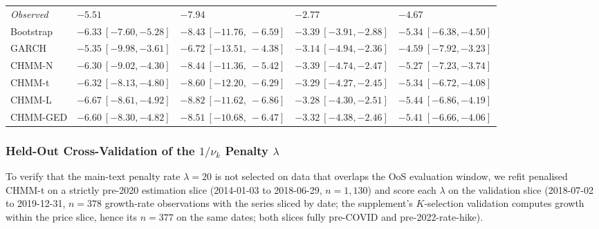 \begin{table}[H]
{\begin{tabular}{l l l l l}
\textit{Observed}  & $-5.51$                      & $-7.94$                      & $-2.77$                      & $-4.67$                      \\
Bootstrap & $-6.33\ [-7.60, -5.28]$      & $-8.43\ [-11.76,\ -6.59]$    & $-3.39\ [-3.91, -2.88]$      & $-5.34\ [-6.38, -4.50]$      \\
GARCH     & $-5.35\ [-9.98, -3.61]$      & $-6.72\ [-13.51,\ -4.38]$    & $-3.14\ [-4.94, -2.36]$      & $-4.59\ [-7.92, -3.23]$      \\
CHMM-N    & $-6.30\ [-9.02, -4.30]$      & $-8.44\ [-11.36,\ -5.42]$    & $-3.39\ [-4.74, -2.47]$      & $-5.27\ [-7.23, -3.74]$      \\
CHMM-t    & $-6.32\ [-8.13, -4.80]$      & $-8.60\ [-12.20,\ -6.29]$    & $-3.29\ [-4.27, -2.45]$      & $-5.34\ [-6.72, -4.08]$      \\
CHMM-L    & $-6.67\ [-8.61, -4.92]$      & $-8.82\ [-11.62,\ -6.86]$    & $-3.28\ [-4.30, -2.51]$      & $-5.44\ [-6.86, -4.19]$      \\
CHMM-GED  & $-6.60\ [-8.30, -4.82]$      & $-8.51\ [-10.68,\ -6.47]$    & $-3.32\ [-4.38, -2.46]$      & $-5.41\ [-6.66, -4.06]$      \\
\bottomrule
\end{tabular}%
}
\end{table}


\subsubsection{\texorpdfstring{Held-Out Cross-Validation of the $1/\nu_k$ Penalty $\lambda$}{Held-Out Cross-Validation of the 1/nu\_k Penalty lambda}}
\label{sec:lambda_cv_pre2020}

To verify that the main-text penalty rate $\lambda = 20$ is not selected on data that overlaps the OoS evaluation window, we refit penalised CHMM-t on a strictly pre-2020 estimation slice (2014-01-03 to 2018-06-29, $n = 1{,}130$) and score each $\lambda$ on the validation slice (2018-07-02 to 2019-12-31, $n = 378$ growth-rate observations with the series sliced by date; the supplement's $K$-selection validation computes growth within the price slice, hence its $n = 377$ on the same dates; both slices fully pre-COVID and pre-2022-rate-hike).

